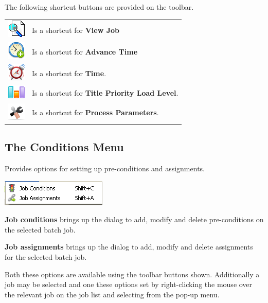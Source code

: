 The following shortcut buttons are provided on the toolbar.

\begin{tabular}{l p{12cm}}
\includegraphics{img/btqwviewjob.png} & Is a shortcut for \textbf{View Job}\\
\includegraphics{img/btqwadvtime.png} & Is a shortcut for \textbf{Advance Time}\\
\includegraphics{img/btqwtimeset.png} & Is a shortcut for \textbf{Time}.\\
\includegraphics{img/btqwtitprill.png} & Is a shortcut for \textbf{Title Priority Load Level}.\\
\includegraphics{img/btqwprocpar.png} & Is a shortcut for \textbf{Process Parameters}.\\
\end{tabular}

\subsection{The Conditions Menu}
Provides options for setting up pre-conditions and assignments.

\includegraphics{img/btqwcondsmenu.png} 

\textbf{Job conditions} brings up the dialog to add, modify and delete
pre-conditions on the selected batch job.

\textbf{Job assignments} brings up the dialog to add, modify and delete
assignments for the selected batch job.

Both these options are available using the toolbar buttons shown.
Additionally a job may be selected and one these options set by
right-clicking the mouse over the relevant job on the job list and
selecting from the pop-up menu.

